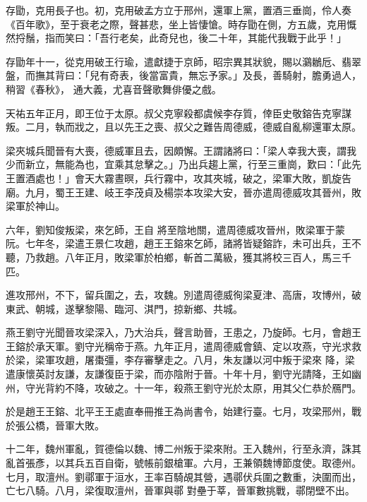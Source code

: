 
\begin{pinyinscope}

 存勖，克用長子也。初，克用破孟方立于邢州，還軍上黨，置酒三垂崗，伶人奏《百年歌》，至于衰老之際，聲甚悲，坐上皆悽愴。時存勖在側，方五歲，克用慨然捋鬚，指而笑曰：「吾行老矣，此奇兒也，後二十年，其能代我戰于此乎！」



 存勖年十一，從克用破王行瑜，遣獻捷于京師，昭宗異其狀貌，賜以鸂鶒卮、翡翠盤，而撫其背曰：「兒有奇表，後當富貴，無忘予家。」及長，善騎射，膽勇過人，稍習《春秋》，
 通大義，尤喜音聲歌舞俳優之戲。



 天祐五年正月，即王位于太原。叔父克寧殺都虞候李存質，倖臣史敬鎔告克寧謀叛。二月，執而戕之，且以先王之喪、叔父之難告周德威，德威自亂柳還軍太原。



 梁夾城兵聞晉有大喪，德威軍且去，因頗懈。王謂諸將曰：「梁人幸我大喪，謂我少而新立，無能為也，宜乘其怠擊之。」乃出兵趨上黨，行至三重崗，歎曰：「此先王置酒處也！」會天大霧晝暝，兵行霧中，攻其夾城，破之，梁軍大敗，凱旋告廟。九月，蜀王王建、岐王李茂貞及楊崇本攻梁大安，晉亦遣周德威攻其晉州，敗梁軍於神山。



 六年，劉知俊叛梁，來乞師，王自
 將至陰地關，遣周德威攻晉州，敗梁軍于蒙阮。七年冬，梁遣王景仁攻趙，趙王王鎔來乞師，諸將皆疑鎔詐，未可出兵，王不聽，乃救趙。八年正月，敗梁軍於柏鄉，斬首二萬級，獲其將校三百人，馬三千匹。



 進攻邢州，不下，留兵圍之，去，攻魏。別遣周德威徇梁夏津、高唐，攻博州，破東武、朝城，遂擊黎陽、臨河、淇門，掠新鄉、共城。



 燕王劉守光聞晉攻梁深入，乃大治兵，聲言助晉，王患之，乃旋師。七月，會趙王王鎔於承天軍。劉守光稱帝于燕。九年正月，遣周德威會鎮、定以攻燕，守光求救於梁，梁軍攻趙，屠棗彊，李存審擊走之。八月，朱友謙以河中叛于梁來
 降，梁遣康懷英討友謙，友謙復臣于梁，而亦陰附于晉。十年十月，劉守光請降，王如幽州，守光背約不降，攻破之。十一年，殺燕王劉守光於太原，用其父仁恭於鴈門。



 於是趙王王鎔、北平王王處直奉冊推王為尚書令，始建行臺。七月，攻梁邢州，戰於張公橋，晉軍大敗。



 十二年，魏州軍亂，賀德倫以魏、博二州叛于梁來附。王入魏州，行至永濟，誅其亂首張彥，以其兵五百自衛，號帳前銀槍軍。六月，王兼領魏博節度使。取德州。七月，取澶州。劉鄩軍于洹水，王率百騎覘其營，遇鄩伏兵圍之數重，決圍而出，亡七八騎。八月，梁復取澶州，晉軍與鄩
 對壘于莘，晉軍數挑戰，鄩閉壁不出。




\end{pinyinscope}

